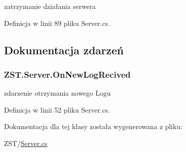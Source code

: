 zatrzymanie działania serwera 



Definicja w linii 89 pliku Server.\+cs.



\subsection{Dokumentacja zdarzeń}
\hypertarget{class_z_s_t_1_1_server_a1f31932af9efeb93ae403ced7cc28ce4}{}
\subsubsection[{On\+New\+Log\+Recived}]{ Z\+S\+T.\+Server.\+On\+New\+Log\+Recived}\label{class_z_s_t_1_1_server_a1f31932af9efeb93ae403ced7cc28ce4}


zdarzenie otrzymania nowego Logu 



Definicja w linii 52 pliku Server.\+cs.



Dokumentacja dla tej klasy została wygenerowana z pliku\+:\begin{DoxyCompactItemize}
\item 
Z\+S\+T/\hyperlink{_server_8cs}{Server.\+cs}\end{DoxyCompactItemize}
